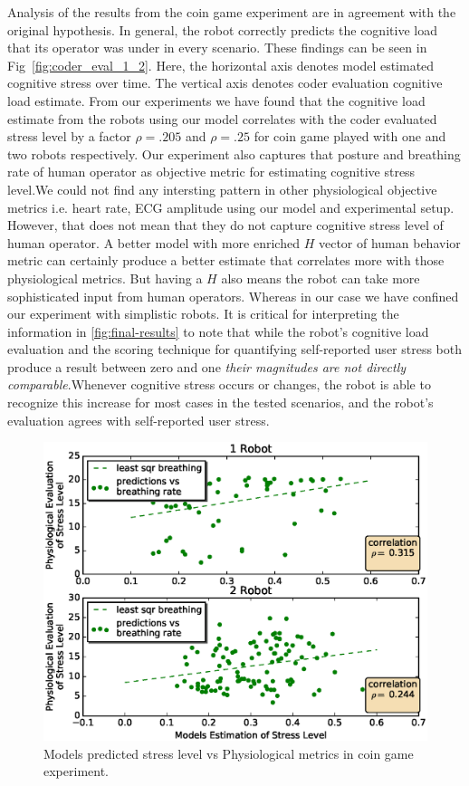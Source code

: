 \documentclass{sig-alternate}
\begin{document}
Analysis of the results from the coin game experiment are in agreement
with the original hypothesis. In general, the robot correctly predicts
the cognitive load that its operator was under in every
scenario. These findings can be seen in Fig~\ref{fig:coder_eval_1_2}.
Here, the horizontal axis denotes model estimated cognitive stress over time. The vertical axis denotes coder evaluation cognitive load estimate. From our experiments we have found that the cognitive load estimate from the robots using our model correlates with the coder evaluated stress level by a factor $\rho=.205$ and $\rho=.25$ for coin game played with one and two robots respectively. Our experiment also captures that posture and breathing rate of human operator as objective metric for estimating cognitive stress level.We could not find any intersting pattern in other physiological objective metrics i.e. heart rate, ECG amplitude using our model and experimental setup. However, that does not mean that they do not capture cognitive stress level of human operator. A better model with more enriched $H$ vector of human behavior metric can certainly produce a better estimate that correlates more with those physiological metrics. But having a $H$ also means the robot can take more sophisticated input from human operators. Whereas in our case we have confined our experiment with simplistic robots.
It is critical for interpreting the information in \ref{fig:final-results} to note that while the robot's cognitive load evaluation and the scoring technique for quantifying
self-reported user stress both produce a result between zero and one
\textit{their magnitudes are not directly comparable}.Whenever cognitive stress occurs or changes, the robot is able to recognize this increase for most cases in the
tested scenarios, and the robot's evaluation agrees with self-reported
user stress.

\begin{figure}  
\centering
\includegraphics[width=.5\textwidth]{prediction_vs_b_p_2.eps}
\caption{Models predicted stress level vs Physiological metrics in coin game experiment.}
\label{fig:pred_phy}
\end{figure}
\end{document}
